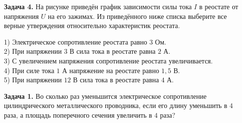 \begin{taskbasic}[code={\label{task:elem_ohm_v18_n15}}]
\textbf{Задача 4.} На рисунке приведён график зависимости силы тока $I$ в реостате от напряжения $U$ на его зажимах. Из приведённого ниже списка выберите все верные утверждения относительно характеристик реостата.

\nopagebreak\smallskip
\begin{center}
\end{center}

1) Электрическое сопротивление реостата равно $3\text{ Ом}$.\\
2) При напряжении $3\text{ В}$ сила тока в реостате равна $2\text{ А}$.\\
3) С увеличением напряжения сопротивление реостата увеличивается.\\
4) При силе тока $1\text{ А}$ напряжение на реостате равно $1{,}5\text{ В}$.\\
5) При напряжении $12\text{ В}$ сила тока в реостате равна $4\text{ А}$.

\end{taskbasic}

\begin{taskbasic}[code={\label{task:elem_ohm_v23_n11}}]
\textbf{Задача 1.} Во сколько раз уменьшится электрическое сопротивление цилиндрического металлического проводника, если его длину уменьшить в $4$ раза, а площадь поперечного сечения увеличить в $4$ раза?

\end{taskbasic}


